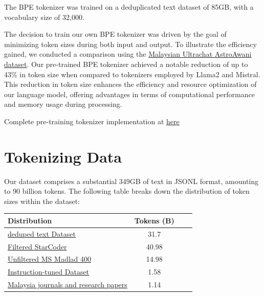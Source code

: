 \documentclass{article}
\begin{document}
The BPE tokenizer was trained on a deduplicated text dataset of 85GB, with a vocabulary size of 32,000.

The decision to train our own BPE tokenizer was driven by the goal of minimizing token sizes during both input and output. To illustrate the efficiency gained, we conducted a comparison using the \href{https://huggingface.co/datasets/mesolitica/malaysian-ultrachat}{Malaysian Ultrachat AstroAwani dataset}. Our pre-trained BPE tokenizer achieved a notable reduction of up to 43\% in token size when compared to tokenizers employed by Llama2 and Mistral. This reduction in token size enhances the efficiency and resource optimization of our language model, offering advantages in terms of computational performance and memory usage during processing.

Complete pre-training tokenizer implementation at \href{https://github.com/malaysia-ai/prepare-tokenizer}{here}

\section{Tokenizing Data}

Our dataset comprises a substantial 349GB of text in JSONL format, amounting to 90 billion tokens. The following table breaks down the distribution of token sizes within the dataset:

\begin{table}[h]
  \centering
  \begin{tabular}{lccl}
    \hline
    \textbf{Distribution}                                                                                                                                                & \textbf{Tokens (B)} \\
    \hline
    \href{https://github.com/malaysia-ai/dedup-text-dataset/blob/main/pretrain-llm/prepare-dedup-text-dataset-4096.ipynb}{deduped text Dataset}                          & 31.7                \\
    \href{https://github.com/malaysia-ai/dedup-text-dataset/blob/main/pretrain-llm/prepare-starcoder-4096.ipynb}{Filtered StarCoder} \cite{li2023starcoder}              & 40.98               \\
    \href{https://github.com/malaysia-ai/dedup-text-dataset/blob/main/pretrain-llm/prepare-starcoder-4096.ipynb}{Unfiltered MS Madlad 400} \cite{kudugunta2023madlad400} & 14.98               \\
    \href{https://github.com/malaysia-ai/dedup-text-dataset/blob/main/pretrain-llm/prepare-instructions.ipynb}{Instruction-tuned Dataset}                                & 1.58                \\
    \href{https://github.com/malaysia-ai/dedup-text-dataset/blob/main/pretrain-llm/prepare-extra.ipynb}{Malaysia journals and research papers}                           & 1.14                \\
    \hline
  \end{tabular}
\end{table}
\end{document}
